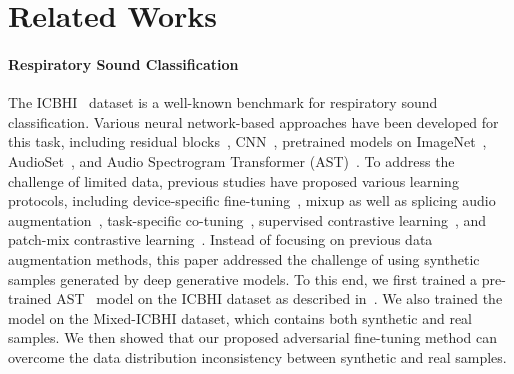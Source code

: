\documentclass{article}
\begin{document}
\vfill\pagebreak
\appendix


\section{Related Works}
\label{appendix_related}
\paragraph{Respiratory Sound Classification} The ICBHI~\cite{rocha2018alpha} dataset is a well-known benchmark for respiratory sound classification. Various neural network-based approaches have been developed for this task, including residual blocks~\cite{gairola2021respirenet, nguyen2022lung, wang2022domain}, CNN~\cite{moummad2022supervised}, pretrained models on ImageNet~\cite{gairola2021respirenet, nguyen2022lung, wang2022domain}, AudioSet~\cite{moummad2022supervised}, and Audio Spectrogram Transformer (AST)~\cite{gong21b_interspeech}. To address the challenge of limited data, previous studies have proposed various learning protocols, including device-specific fine-tuning~\cite{gairola2021respirenet}, mixup as well as splicing audio augmentation~\cite{wang2022domain}, task-specific co-tuning~\cite{nguyen2022lung}, supervised contrastive learning~\cite{moummad2022supervised}, and patch-mix contrastive learning~\cite{bae23b_interspeech}. Instead of focusing on previous data augmentation methods, this paper addressed the challenge of using synthetic samples generated by deep generative models. To this end, we first trained a pre-trained AST~\cite{bae23b_interspeech} model on the ICBHI dataset as described in~\cite{gong21b_interspeech}. We also trained the model on the Mixed-ICBHI dataset, which contains both synthetic and real samples. We then showed that our proposed adversarial fine-tuning method can overcome the data distribution inconsistency between synthetic and real samples.
\end{document}
